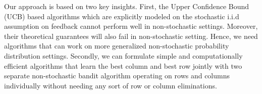 Our approach is based on two key insights. First, the Upper Confidence Bound (UCB) based algorithms which are explicitly modeled on the stochastic i.i.d assumption on feedback cannot perform well in non-stochastic settings. Moreover, their theoretical guarantees will also fail in non-stochastic setting. Hence, we need algorithms that can work on more generalized non-stochastic probability distribution settings. Secondly, we can formulate simple and computationally efficient algorithms that learn the best column and best row jointly  with two separate non-stochastic bandit algorithm operating on rows and columns individually without needing any sort of row or column  eliminations. 




